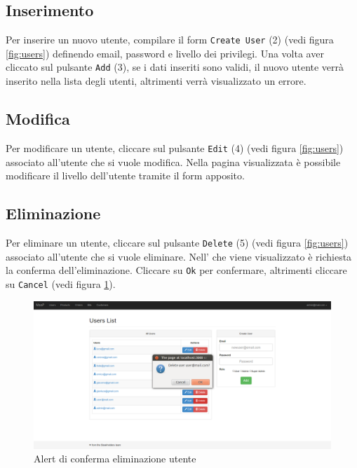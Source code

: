 	
	\subsection{Inserimento}
	\label{utenti-inserimento}
	Per inserire un nuovo utente, compilare il form \texttt{Create User} (2) (vedi figura \ref{fig:users}) definendo email, password e livello dei privilegi. Una volta aver cliccato sul pulsante \texttt{Add} (3), se i dati inseriti sono validi, il nuovo utente verrà inserito nella lista degli utenti, altrimenti verrà visualizzato un errore.


	\subsection{Modifica}
	\label{utenti-modifica}
	Per modificare un utente, cliccare sul pulsante \texttt{Edit} (4) (vedi figura \ref{fig:users}) associato all'utente che si vuole modifica. Nella pagina visualizzata è possibile modificare il livello dell'utente tramite il form apposito.


	\subsection{Eliminazione}
	\label{utenti-eliminazione}
	Per eliminare un utente, cliccare sul pulsante \texttt{Delete} (5) (vedi figura \ref{fig:users}) associato all'utente che si vuole eliminare. Nell' che viene visualizzato è richiesta la conferma dell'eliminazione. Cliccare su \texttt{Ok} per confermare, altrimenti cliccare su \texttt{Cancel} (vedi figura \ref{fig:alerteliminazioneutente}).

	\begin{figure}[H]
	\label{fig:alerteliminazioneutente}
		\centering \includegraphics[width=1\textwidth]{img/alert-eliminazione-utente.png}
		\caption{Alert di conferma eliminazione utente}
	\end{figure}